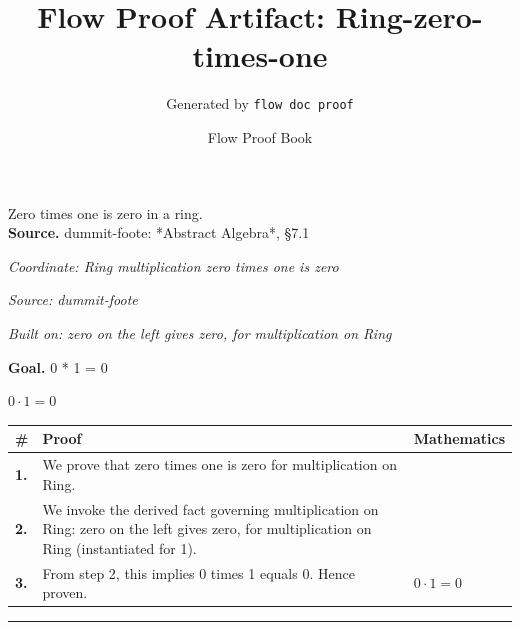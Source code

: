 \documentclass[11pt]{article}
\title{Flow Proof Artifact: Ring-zero-times-one}
\author{Generated by \texttt{flow doc proof}}
\date{Flow Proof Book}
\theoremstyle{definition}
\begin{document}
\maketitle
Zero times one is zero in a ring.\\[0.5em]
\textbf{Source.} dummit-foote: *Abstract Algebra*, §7.1\\[0.5em]
\bigskip
{}\par
\smallskip\noindent\textit{Coordinate: Ring \cdot multiplication \cdot zero times one is zero}\par
\smallskip\noindent\textit{Source: dummit-foote}\par
\smallskip\noindent\textit{Built on: zero on the left gives zero, for multiplication on Ring}\par
\medskip
\noindent\textbf{Goal.} 0 * 1 = 0\par
\noindent$\displaystyle 0 \cdot 1 = 0$\par
\medskip
\noindent
\begin{tabular}{@{} >{\raggedright\arraybackslash}p{} >{\raggedright\arraybackslash}p{} >{\raggedleft\arraybackslash}p{} @{}}
\textbf{\#} & \textbf{Proof} & \textbf{Mathematics} \\
\midrule
\textbf{1.} & We prove that zero times one is zero for multiplication on Ring. & \\[0.45em]
\textbf{2.} & We invoke the derived fact governing multiplication on Ring: zero on the left gives zero, for multiplication on Ring (instantiated for 1). & \\[0.45em]
\textbf{3.} & From step 2, this implies 0 times 1 equals 0. Hence proven. & $\displaystyle 0 \cdot 1 = 0$ \\[0.45em]
\bottomrule
\end{tabular}
\label{thm:Ring-multiplication-zero_times_one_is_zero}
\par\medskip\hrule
\end{document}
